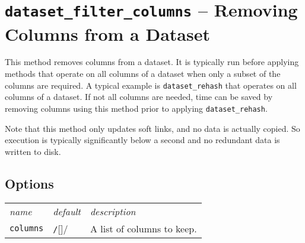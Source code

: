 





\clearpage
\section{\texttt{dataset\_filter\_columns} -- Removing Columns from a Dataset}

This method removes columns from a dataset.  It is typically run
before applying methods that operate on all columns of a dataset when
only a subset of the columns are required.  A typical example is
\texttt{dataset\_rehash} that operates on all columns of a dataset.
If not all columns are needed, time can be saved by removing columns
using this method prior to applying \texttt{dataset\_rehash}.

Note that this method only updates soft links, and no data is actually
copied.  So execution is typically significantly below a second and no
redundant data is written to disk.

\subsection*{Options}
\begin{tabular}{ p{3.2cm} p{1.8cm} p{10cm}}\hline
  \textsl{name} & \textsl{default} & \textsl{description}\\[2ex]

  \texttt{columns} & \texttt/[]/ & A list of columns to
  keep.\\[1ex]
  \hline
\end{tabular}






